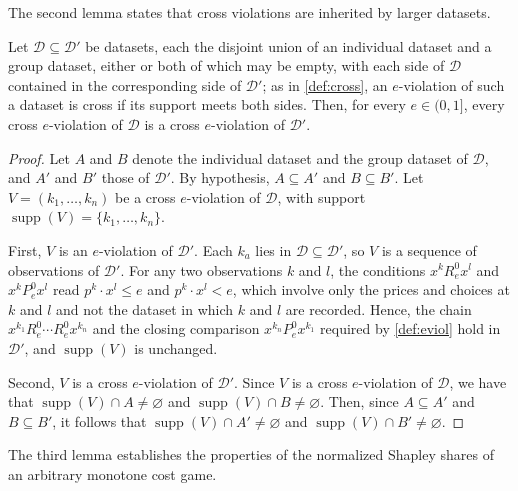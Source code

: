 \documentclass[11 pt]{article}
\begin{document}
The second lemma states that cross violations are inherited by larger datasets.

\begin{lemma}\label{lem:app_transfer}
Let $\mathcal{D} \subseteq \mathcal{D}'$ be datasets, each the disjoint union of an individual dataset and a group dataset, either or both of which may be empty, with each side of $\mathcal{D}$ contained in the corresponding side of $\mathcal{D}'$; as in \autoref{def:cross}, an $e$-violation of such a dataset is cross if its support meets both sides. Then, for every $e \in (0,1]$, every cross $e$-violation of $\mathcal{D}$ is a cross $e$-violation of $\mathcal{D}'$.
\end{lemma}

\begin{proof}
Let $A$ and $B$ denote the individual dataset and the group dataset of $\mathcal{D}$, and $A'$ and $B'$ those of $\mathcal{D}'$. By hypothesis, $A \subseteq A'$ and $B \subseteq B'$. Let $V = (k_{1}, \dots, k_{n})$ be a cross $e$-violation of $\mathcal{D}$, with support $\operatorname{supp}(V) = \{ k_{1}, \dots, k_{n} \}$.

First, $V$ is an $e$-violation of $\mathcal{D}'$. Each $k_{a}$ lies in $\mathcal{D} \subseteq \mathcal{D}'$, so $V$ is a sequence of observations of $\mathcal{D}'$. For any two observations $k$ and $l$, the conditions $x^{k} \mathrel{R^{0}_{e}} x^{l}$ and $x^{k} \mathrel{P^{0}_{e}} x^{l}$ read $p^{k} \cdot x^{l} \leq e$ and $p^{k} \cdot x^{l} < e$, which involve only the prices and choices at $k$ and $l$ and not the dataset in which $k$ and $l$ are recorded. Hence, the chain $x^{k_{1}} \mathrel{R^{0}_{e}} \cdots \mathrel{R^{0}_{e}} x^{k_{n}}$ and the closing comparison $x^{k_{n}} \mathrel{P^{0}_{e}} x^{k_{1}}$ required by \autoref{def:eviol} hold in $\mathcal{D}'$, and $\operatorname{supp}(V)$ is unchanged.

Second, $V$ is a cross $e$-violation of $\mathcal{D}'$. Since $V$ is a cross $e$-violation of $\mathcal{D}$, we have that $\operatorname{supp}(V) \cap A \neq \varnothing$ and $\operatorname{supp}(V) \cap B \neq \varnothing$. Then, since $A \subseteq A'$ and $B \subseteq B'$, it follows that $\operatorname{supp}(V) \cap A' \neq \varnothing$ and $\operatorname{supp}(V) \cap B' \neq \varnothing$.
\end{proof}

The third lemma establishes the properties of the normalized Shapley shares of an arbitrary monotone cost game.
\end{document}
